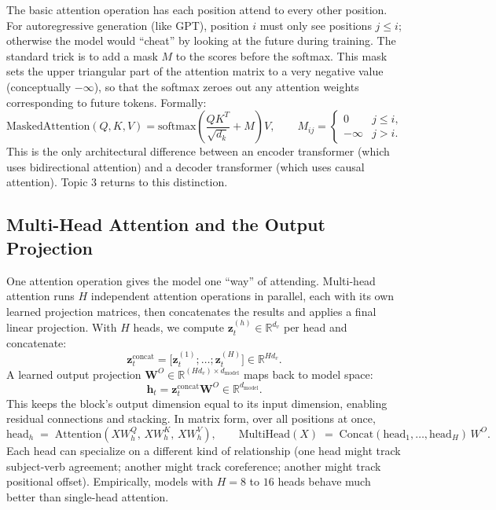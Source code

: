 \documentclass[11pt]{article}
\theoremstyle{remark}
\begin{document}
The basic attention operation has each position attend to every other position. For autoregressive generation (like GPT), position \(i\) must only see positions \(j \leq i\); otherwise the model would ``cheat'' by looking at the future during training. The standard trick is to add a mask \(M\) to the scores before the softmax. This mask sets the upper triangular part of the attention matrix to a very negative value (conceptually \(-\infty\)), so that the softmax zeroes out any attention weights corresponding to future tokens. Formally:
\[
\text{MaskedAttention}(Q, K, V) = \text{softmax}\!\left(\frac{QK^T}{\sqrt{d_k}} + M\right)V,
\qquad
M_{ij} = \begin{cases} 0 & j \leq i, \\ -\infty & j > i. \end{cases}
\]
This is the only architectural difference between an encoder transformer (which uses bidirectional attention) and a decoder transformer (which uses causal attention). Topic 3 returns to this distinction.

\subsection{Multi-Head Attention and the Output Projection}

One attention operation gives the model one ``way'' of attending. Multi-head attention runs \(H\) independent attention operations in parallel, each with its own learned projection matrices, then concatenates the results and applies a final linear projection. With \(H\) heads, we compute \(\mathbf{z}_t^{(h)}\in\mathbb{R}^{d_v}\) per head and concatenate:
\[
\mathbf{z}_t^{\text{concat}}=\big[\mathbf{z}_t^{(1)};\dots;\mathbf{z}_t^{(H)}\big]\in\mathbb{R}^{H d_v}.
\]
A learned output projection \(\mathbf{W}^O\in\mathbb{R}^{(H d_v)\times d_{\text{model}}}\) maps back to model space:
\[
\mathbf{h}_t = \mathbf{z}_t^{\text{concat}}\mathbf{W}^O \in \mathbb{R}^{d_{\text{model}}}.
\]
This keeps the block's output dimension equal to its input dimension, enabling residual connections and stacking. In matrix form, over all positions at once,
\[
\mathrm{head}_h \;=\; \mathrm{Attention}\!\left(X W^{Q}_h,\, X W^{K}_h,\, X W^{V}_h\right), \qquad \mathrm{MultiHead}(X) \;=\; \mathrm{Concat}(\mathrm{head}_1, \dots, \mathrm{head}_H)\, W^{O}.
\]
Each head can specialize on a different kind of relationship (one head might track subject-verb agreement; another might track coreference; another might track positional offset). Empirically, models with \(H = 8\) to \(16\) heads behave much better than single-head attention.
\end{document}
